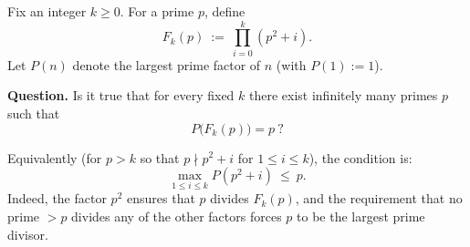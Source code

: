 Fix an integer $k\ge 0$. For a prime $p$, define
\[
F_k(p)\ :=\ \prod_{i=0}^{k}(p^2+i).
\]
Let $P(n)$ denote the largest prime factor of $n$ (with $P(1):=1$).

\noindent\textbf{Question.} Is it true that for every fixed $k$ there exist infinitely many primes $p$ such that
\[
P\bigl(F_k(p)\bigr) = p\ ? 
\]

Equivalently (for $p>k$ so that $p\nmid p^2+i$ for $1\le i\le k$), the condition is:
\[
\max_{1\le i\le k} P(p^2+i)\ \le\ p.
\]
Indeed, the factor $p^2$ ensures that $p$ divides $F_k(p)$, and the requirement that no prime $>p$ divides any of the other factors forces $p$ to be the largest prime divisor.
